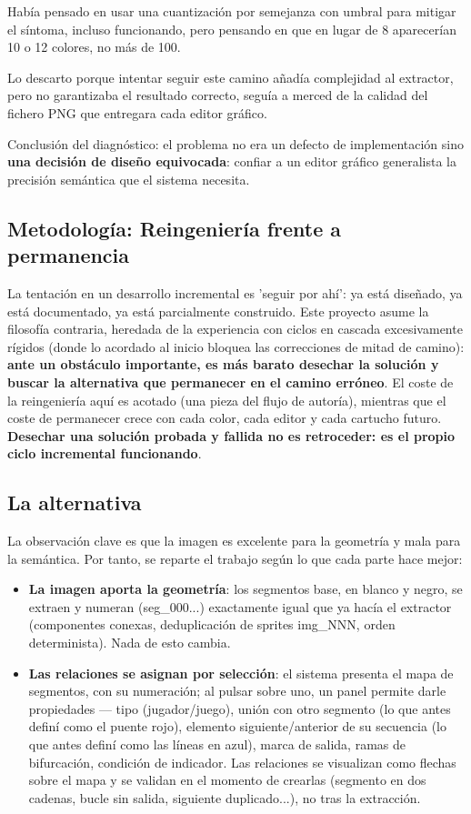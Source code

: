 Había pensado en usar una cuantización por semejanza con umbral para mitigar el síntoma, incluso funcionando, pero pensando en que en lugar de 8 aparecerían 10 o 12 colores, no más de 100.

Lo descarto porque intentar seguir este camino añadía complejidad al extractor, pero no garantizaba el resultado correcto, seguía a merced de la calidad del fichero PNG que entregara cada editor gráfico.

Conclusión del diagnóstico: el problema no era un defecto de implementación sino \textbf{una decisión de diseño equivocada}: confiar a un editor gráfico generalista la precisión semántica que el sistema necesita.

\subsection{Metodología: Reingeniería frente a permanencia}
La tentación en un desarrollo incremental es 'seguir por ahí': ya está diseñado, ya está documentado, ya está parcialmente construido. Este proyecto asume la filosofía contraria, heredada de la experiencia con ciclos en cascada excesivamente rígidos (donde lo acordado al inicio bloquea las correcciones de mitad de camino): \textbf{ante un obstáculo importante, es más barato desechar la solución y buscar la alternativa que permanecer en el camino erróneo}. El coste de la reingeniería aquí es acotado (una pieza del flujo de autoría), mientras que el coste de permanecer crece con cada color, cada editor y cada cartucho futuro. \textbf{Desechar una solución probada y fallida no es retroceder: es el propio ciclo incremental funcionando}.

\subsection{La alternativa}
La observación clave es que la imagen es excelente para la geometría y mala para la semántica. Por tanto, se reparte el trabajo según lo que cada parte hace mejor:
\begin{itemize}
	\item \textbf{La imagen aporta la geometría}: los segmentos base, en blanco y negro, se extraen y numeran (seg\_000...) exactamente igual que ya hacía el extractor (componentes conexas, deduplicación de sprites img\_NNN, orden determinista). Nada de esto cambia.
	\item \textbf{Las relaciones se asignan por selección}: el sistema presenta el mapa de segmentos, con su numeración; al pulsar sobre uno, un panel permite darle propiedades — tipo (jugador/juego), unión con otro segmento (lo que antes definí como el puente rojo), elemento siguiente/anterior de su secuencia (lo que antes definí como las líneas en azul), marca de salida, ramas de bifurcación, condición de indicador. Las relaciones se visualizan como flechas sobre el mapa y se validan en el momento de crearlas (segmento en dos cadenas, bucle sin salida, siguiente duplicado...), no tras la extracción.
\end{itemize}


